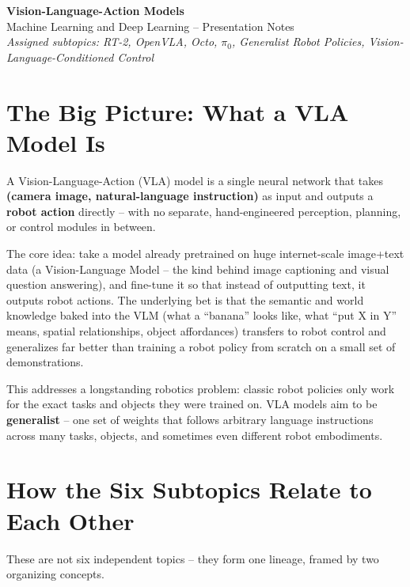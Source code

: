 \documentclass[a4paper,11pt]{article}
\begin{document}
\begin{center}
	{\LARGE \textbf{Vision-Language-Action Models}}\\
	\vspace{2pt}
	Machine Learning and Deep Learning -- Presentation Notes\\
	\vspace{2pt}
	\textit{Assigned subtopics: RT-2, OpenVLA, Octo, $\pi_0$, Generalist Robot Policies, Vision-Language-Conditioned Control}
\end{center}

\vspace{6pt}

\section{The Big Picture: What a VLA Model Is}

A Vision-Language-Action (VLA) model is a single neural network that takes \textbf{(camera image, natural-language instruction)} as input and outputs a \textbf{robot action} directly -- with no separate, hand-engineered perception, planning, or control modules in between.

The core idea: take a model already pretrained on huge internet-scale image+text data (a Vision-Language Model -- the kind behind image captioning and visual question answering), and fine-tune it so that instead of outputting text, it outputs robot actions. The underlying bet is that the semantic and world knowledge baked into the VLM (what a ``banana'' looks like, what ``put X in Y'' means, spatial relationships, object affordances) transfers to robot control and generalizes far better than training a robot policy from scratch on a small set of demonstrations.

This addresses a longstanding robotics problem: classic robot policies only work for the exact tasks and objects they were trained on. VLA models aim to be \textbf{generalist} -- one set of weights that follows arbitrary language instructions across many tasks, objects, and sometimes even different robot embodiments.

\section{How the Six Subtopics Relate to Each Other}

These are not six independent topics -- they form one lineage, framed by two organizing concepts.
\end{document}
